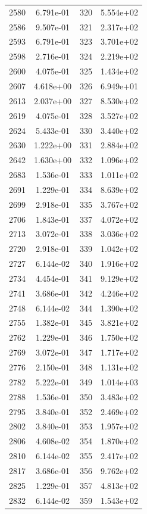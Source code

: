 \documentclass[12pt]{article}
\begin{document}
\begin{longtable}{@{}cccc@{}}
2580 & 6.791e-01 & 320 & 5.554e+02 \\
2586 & 9.507e-01 & 321 & 2.317e+02 \\
2593 & 6.791e-01 & 323 & 3.701e+02 \\
2598 & 2.716e-01 & 324 & 2.219e+02 \\
2600 & 4.075e-01 & 325 & 1.434e+02 \\
2607 & 4.618e+00 & 326 & 6.949e+01 \\
2613 & 2.037e+00 & 327 & 8.530e+02 \\
2619 & 4.075e-01 & 328 & 3.527e+02 \\
2624 & 5.433e-01 & 330 & 3.440e+02 \\
2630 & 1.222e+00 & 331 & 2.884e+02 \\
2642 & 1.630e+00 & 332 & 1.096e+02 \\
2683 & 1.536e-01 & 333 & 1.011e+02 \\
2691 & 1.229e-01 & 334 & 8.639e+02 \\
2699 & 2.918e-01 & 335 & 3.767e+02 \\
2706 & 1.843e-01 & 337 & 4.072e+02 \\
2713 & 3.072e-01 & 338 & 3.036e+02 \\
2720 & 2.918e-01 & 339 & 1.042e+02 \\
2727 & 6.144e-02 & 340 & 1.916e+02 \\
2734 & 4.454e-01 & 341 & 9.129e+02 \\
2741 & 3.686e-01 & 342 & 4.246e+02 \\
2748 & 6.144e-02 & 344 & 1.390e+02 \\
2755 & 1.382e-01 & 345 & 3.821e+02 \\
2762 & 1.229e-01 & 346 & 1.750e+02 \\
2769 & 3.072e-01 & 347 & 1.717e+02 \\
2776 & 2.150e-01 & 348 & 1.131e+02 \\
2782 & 5.222e-01 & 349 & 1.014e+03 \\
2788 & 1.536e-01 & 350 & 3.483e+02 \\
2795 & 3.840e-01 & 352 & 2.469e+02 \\
2802 & 3.840e-01 & 353 & 1.957e+02 \\
2806 & 4.608e-02 & 354 & 1.870e+02 \\
2810 & 6.144e-02 & 355 & 2.417e+02 \\
2817 & 3.686e-01 & 356 & 9.762e+02 \\
2825 & 1.229e-01 & 357 & 4.813e+02 \\
2832 & 6.144e-02 & 359 & 1.543e+02 \\

\end{longtable}
\end{document}

